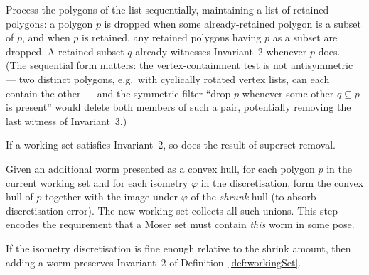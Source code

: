 \begin{definition}
  \label{def:supersetRemoval}
  \leanok
  Process the polygons of the list sequentially, maintaining a list of
  retained polygons: a polygon $p$ is dropped when some already-retained
  polygon is a subset of $p$, and when $p$ is retained, any retained
  polygons having $p$ as a subset are dropped. A retained subset $q$
  already witnesses Invariant~2 whenever $p$ does. (The sequential form
  matters: the vertex-containment test is not antisymmetric --- two
  distinct polygons, e.g.\ with cyclically rotated vertex lists, can each
  contain the other --- and the symmetric filter ``drop $p$ whenever some
  other $q \subseteq p$ is present'' would delete both members of such a
  pair, potentially removing the last witness of Invariant~3.)
\end{definition}

\begin{proposition}
  \label{prop:supersetRemoval-correct}
  \leanok
  If a working set satisfies Invariant~2, so does the result of superset
  removal.
\end{proposition}

\begin{definition}
  \label{def:wormAdding}
  \leanok
  Given an additional worm presented as a convex hull, for each polygon
  $p$ in the current working set and for each isometry $\varphi$ in the
  discretisation, form the convex hull of $p$ together with the image
  under $\varphi$ of the \emph{shrunk} hull (to absorb discretisation
  error). The new working set collects all such unions. This step encodes
  the requirement that a Moser set must contain \emph{this} worm in some
  pose.
\end{definition}

\begin{proposition}
  \label{prop:wormAdding-correct}
  If the isometry discretisation is fine enough relative to the shrink
  amount, then adding a worm preserves Invariant~2 of
  Definition~\ref{def:workingSet}.
\end{proposition}

